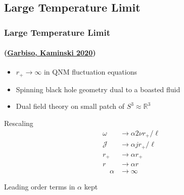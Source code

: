 \documentclass[xcolor=dvipsnames]{beamer}
\begin{document}
\subsection{Large Temperature Limit}

\begin{frame}[squeeze]
  \frametitle{Large Temperature Limit}
  \framesubtitle{(\href{https://inspirehep.net/literature/1806001}{Garbiso, Kaminski 2020})}

  \begin{itemize}
    \item $r_+ \to \infty$ in QNM fluctuation equations
    \item Spinning black hole geometry dual to a boasted fluid
    \item Dual field theory on small patch of $S^3 \approx \mathbb{R}^3$
  \end{itemize}

  \begin{block}{Rescaling}
    \begin{equation*}
      \begin{aligned}
        \omega &\to \alpha 2\nu r_+/\ell \\
        \mathcal{J} &\to \alpha j r_+/\ell \\
        r_+ &\to \alpha r_+ \\
        r &\to \alpha r\\
        \quad \alpha&\to\infty
      \end{aligned}
    \end{equation*}
  \end{block}

  \begin{alertblock}{}
    Leading order terms in $\alpha$ kept
  \end{alertblock}

\end{frame}

\end{document}
